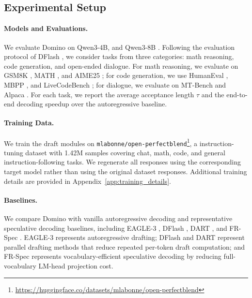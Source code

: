 \documentclass{llmxive}
\begin{document}
\label{sec:experiments}
\subsection{Experimental Setup}

\paragraph{Models and Evaluations.}
We evaluate Domino on Qwen3-4B, and Qwen3-8B \citep{qwen2025qwen3}. Following the evaluation protocol of DFlash \citep{chen2026dflash}, we consider tasks from three categories: math reasoning, code generation, and open-ended dialogue. For math reasoning, we evaluate on GSM8K \citep{cobbe2021training}, MATH \citep{hendrycks2021measuring}, and AIME25 \citep{maa2025aime}; for code generation, we use HumanEval \citep{chen2021evaluating}, MBPP \citep{austin2021program}, and LiveCodeBench \citep{jain2024livecodebench}; for dialogue, we evaluate on MT-Bench \citep{zheng2023judging} and Alpaca \citep{taori2023alpaca}. For each task, we report the average acceptance length \(\tau\) and the end-to-end decoding speedup over the autoregressive baseline.

\paragraph{Training Data.}
We train the draft modules on \texttt{mlabonne/open-perfectblend}\footnote{\url{https://huggingface.co/datasets/mlabonne/open-perfectblend}}, a instruction-tuning dataset with 1.42M samples covering chat, math, code, and general instruction-following tasks. We regenerate all responses using the corresponding target model rather than using the original dataset responses. Additional training details are provided in Appendix~\ref{app:training_details}.

\paragraph{Baselines.}
We compare Domino with vanilla autoregressive decoding and representative speculative decoding baselines, including EAGLE-3 \citep{li2025eagle3}, DFlash \citep{chen2026dflash}, DART \citep{liu2026dart}, and FR-Spec \citep{zhao2025fr}. EAGLE-3 represents autoregressive drafting; DFlash and DART represent parallel drafting methods that reduce repeated per-token draft computation; and FR-Spec represents vocabulary-efficient speculative decoding by reducing full-vocabulary LM-head projection cost.  
\end{document}
